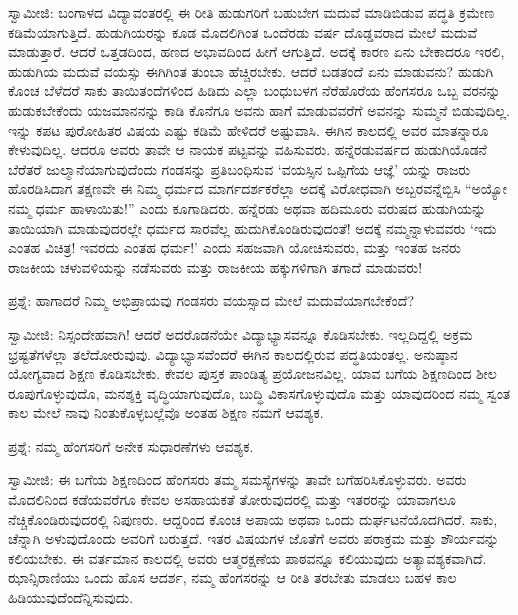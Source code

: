 ಸ್ವಾಮೀಜಿ: ಬಂಗಾಳದ ವಿದ್ಯಾವಂತರಲ್ಲಿ ಈ ರೀತಿ ಹುಡುಗರಿಗೆ ಬಹುಬೇಗ ಮದುವೆ ಮಾಡಿಬಿಡುವ ಪದ್ಧತಿ ಕ್ರಮೇಣ ಕಡಿಮೆಯಾಗುತ್ತಿದೆ. ಹುಡುಗಿಯರನ್ನು ಕೂಡ ಮೊದಲಿಗಿಂತ ಒಂದೆರಡು ವರ್ಷ ದೊಡ್ಡವರಾದ ಮೇಲೆ ಮದುವೆ ಮಾಡುತ್ತಾರೆ. ಆದರೆ ಒತ್ತಡದಿಂದ, ಹಣದ ಅಭಾವದಿಂದ ಹೀಗೆ ಆಗುತ್ತಿದೆ. ಅದಕ್ಕೆ ಕಾರಣ ಏನು ಬೇಕಾದರೂ ಇರಲಿ, ಹುಡುಗಿಯ ಮದುವೆ ವಯಸ್ಸು ಈಗಿಗಿಂತ ತುಂಬಾ ಹೆಚ್ಚಿರಬೇಕು. ಆದರೆ ಬಡತಂದೆ ಏನು ಮಾಡುವನು? ಹುಡುಗಿ ಕೊಂಚ ಬೆಳೆದರೆ ಸಾಕು ತಾಯಿತಂದೆಗಳಿಂದ ಹಿಡಿದು ಎಲ್ಲಾ ಬಂಧುಬಳಗ ನೆರೆಹೊರೆಯ ಹೆಂಗಸರೂ ಒಬ್ಬ ವರನನ್ನು ಹುಡುಕಬೇಕೆಂದು ಯಜಮಾನನನ್ನು ಕಾಡಿ ಕೊನೆಗೂ ಅವನು ಹಾಗೆ ಮಾಡುವವರೆಗೆ ಅವನನ್ನು ಸುಮ್ಮನೆ ಬಿಡುವುದಿಲ್ಲ. ಇನ್ನು ಕಪಟ ಪುರೋಹಿತರ ವಿಷಯ ಎಷ್ಟು ಕಡಿಮೆ ಹೇಳಿದರೆ ಅಷ್ಟುವಾಸಿ. ಈಗಿನ ಕಾಲದಲ್ಲಿ ಅವರ ಮಾತನ್ನಾರೂ ಕೇಳುವುದಿಲ್ಲ. ಆದರೂ ಅವರು ತಾವೇ ಆ ನಾಯಕ ಪಟ್ಟವನ್ನು ವಹಿಸುವರು. ಹನ್ನೆರಡುವರ್ಷದ ಹುಡುಗಿಯೊಡನೆ ಬೆರೆತರೆ ಜುಲ್ಮಾನೆಯಾಗುವುದೆಂದು ಗಂಡಸನ್ನು ಪ್ರತಿಬಂಧಿಸುವ ‘ವಯಸ್ಸಿನ ಒಪ್ಪಿಗೆಯ ಆಜ್ಞೆ’  ಯನ್ನು ರಾಜರು ಹೊರಡಿಸಿದಾಗ ತಕ್ಷಣವೇ ಈ ನಿಮ್ಮ ಧರ್ಮದ ಮಾರ್ಗದರ್ಶಕರೆಲ್ಲಾ ಅದಕ್ಕೆ ವಿರೋಧವಾಗಿ ಅಬ್ಬರವನ್ನೆಬ್ಬಿಸಿ “ಅಯ್ಯೋ ನಮ್ಮ ಧರ್ಮ ಹಾಳಾಯಿತು!” ಎಂದು ಕೂಗಾಡಿದರು. ಹನ್ನೆರಡು ಅಥವಾ ಹದಿಮೂರು ವರುಷದ ಹುಡುಗಿಯನ್ನು ತಾಯಿಯಾಗಿ ಮಾಡುವುದರಲ್ಲೇ ಧರ್ಮದ ಸಾರವೆಲ್ಲ ಹುದುಗಿಕೊಂಡಿರುವುದಂತೆ! ಅದಕ್ಕೆ ನಮ್ಮನ್ನಾಳುವವರು ‘ಇದು ಎಂತಹ ವಿಚಿತ್ರ! ಇವರದು ಎಂತಹ ಧರ್ಮ!’ ಎಂದು ಸಹಜವಾಗಿ ಯೋಚಿಸುವರು, ಮತ್ತು ಇಂತಹ ಜನರು ರಾಜಕೀಯ ಚಳುವಳಿಯನ್ನು ನಡೆಸುವರು ಮತ್ತು ರಾಜಕೀಯ ಹಕ್ಕುಗಳಿಗಾಗಿ ತಗಾದೆ ಮಾಡುವರು!

ಪ್ರಶ್ನೆ: ಹಾಗಾದರೆ ನಿಮ್ಮ ಅಭಿಪ್ರಾಯವು ಗಂಡಸರು ವಯಸ್ಸಾದ ಮೇಲೆ ಮದುವೆಯಾಗಬೇಕೆಂದೆ?

ಸ್ವಾಮೀಜಿ: ನಿಸ್ಸಂದೇಹವಾಗಿ! ಆದರೆ ಅದರೊಡನೆಯೇ ವಿದ್ಯಾಭ್ಯಾಸವನ್ನೂ ಕೊಡಿಸಬೇಕು. ಇಲ್ಲದಿದ್ದಲ್ಲಿ ಅಕ್ರಮ ಭ್ರಷ್ಟತೆಗಳೆಲ್ಲಾ ತಲೆದೋರುವುವು. ವಿದ್ಯಾಭ್ಯಾಸವೆಂದರೆ ಈಗಿನ ಕಾಲದಲ್ಲಿರುವ ಪದ್ಧತಿಯಂತಲ್ಲ. ಅನುಷ್ಠಾನ ಯೋಗ್ಯವಾದ ಶಿಕ್ಷಣ ಕೊಡಿಸಬೇಕು. ಕೇವಲ ಪುಸ್ತಕ ಪಾಂಡಿತ್ಯ ಪ್ರಯೋಜನವಿಲ್ಲ. ಯಾವ ಬಗೆಯ ಶಿಕ್ಷಣದಿಂದ ಶೀಲ ರೂಪುಗೊಳ್ಳುವುದೊ, ಮನಶ್ಶಕ್ತಿ ವೃದ್ಧಿಯಾಗುವುದೊ, ಬುದ್ಧಿ ವಿಕಾಸಗೊಳ್ಳುವುದೊ ಮತ್ತು ಯಾವುದರಿಂದ ನಮ್ಮ ಸ್ವಂತ ಕಾಲ ಮೇಲೆ ನಾವು ನಿಂತುಕೊಳ್ಳಬಲ್ಲೆವೊ ಅಂತಹ ಶಿಕ್ಷಣ ನಮಗೆ ಆವಶ್ಯಕ.

ಪ್ರಶ್ನೆ: ನಮ್ಮ ಹೆಂಗಸರಿಗೆ ಅನೇಕ ಸುಧಾರಣೆಗಳು ಆವಶ್ಯಕ.

ಸ್ವಾಮೀಜಿ: ಈ ಬಗೆಯ ಶಿಕ್ಷಣದಿಂದ ಹೆಂಗಸರು ತಮ್ಮ ಸಮಸ್ಯೆಗಳನ್ನು ತಾವೇ ಬಗೆಹರಿಸಿಕೊಳ್ಳುವರು. ಅವರು ಮೊದಲಿನಿಂದ ಕಡೆಯವರೆಗೂ ಕೇವಲ ಅಸಹಾಯಕತೆ ತೋರುವುದರಲ್ಲಿ ಮತ್ತು ಇತರರನ್ನು ಯಾವಾಗಲೂ ನೆಚ್ಚಿಕೊಂಡಿರುವುದರಲ್ಲಿ ನಿಪುಣರು. ಆದ್ದರಿಂದ ಕೊಂಚ ಅಪಾಯ ಅಥವಾ ಒಂದು ದುರ್ಘಟನೆಯೊದಗಿದರೆ. ಸಾಕು, ಚೆನ್ನಾಗಿ ಅಳುವುದೊಂದು ಅವರಿಗೆ ಬರುತ್ತದೆ. ಇತರ ವಿಷಯಗಳ ಜೊತೆಗೆ ಅವರು ಪರಾಕ್ರಮ ಮತ್ತು ಶೌರ್ಯವನ್ನು ಕಲಿಯಬೇಕು. ಈ ವರ್ತಮಾನ ಕಾಲದಲ್ಲಿ ಅವರು ಆತ್ಮರಕ್ಷಣೆಯ ಪಾಠವನ್ನೂ ಕಲಿಯುವುದು ಅತ್ಯಾವಶ್ಯಕವಾಗಿದೆ. ಝಾನ್ಸಿರಾಣಿಯು ಒಂದು ಹೊಸ ಆದರ್ಶ, ನಮ್ಮ ಹೆಂಗಸರನ್ನು ಆ ರೀತಿ ತರಬೇತು ಮಾಡಲು ಬಹಳ ಕಾಲ ಹಿಡಿಯುವುದೆಂದೆನ್ನಿಸುವುದು.

